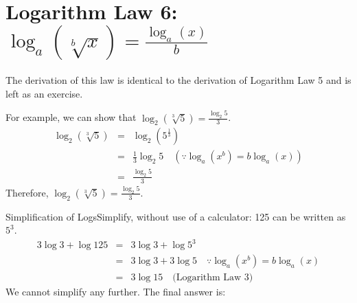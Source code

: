 \section{Logarithm Law 6: $\log_{a}\left(\sqrt[b]{x}\right) = \frac{\log_{a}(x)}{b}$}

The derivation of this law is identical to the derivation of Logarithm Law 5 and is left as an exercise.

For example, we can show that $\log_{2}(\sqrt[3]{5}) = \frac{\log_{2}5}{3} $.
\begin{eqnarray*}
\log_{2}(\sqrt[3]{5}) &=& \log_2 (5^{\frac{1}{3}})\\
&=& \frac{1}{3} \log_2 5 \quad (\because \log_{a}(x^b) = b \log_{a}(x))\\
&=&\frac{\log_{2}5}{3}
\end{eqnarray*}
Therefore, $\log_{2}(\sqrt[3]{5}) = \frac{\log_{2}5}{3}$.



\begin{wex}{Simplification of Logs}{Simplify, without use of a calculator:
}
{
125 can be written as $5^3$.
\begin{eqnarray*}
3\log 3 + \log 125 &=&3\log 3 + \log 5^3\\
&=&3\log 3 + 3\log 5 \quad \because \log_{a}(x^b) = b \log_{a}(x)\\
&=&3\log 15 \quad \mbox{(Logarithm Law 3)}
\end{eqnarray*}
We cannot simplify any further. The final answer is:
}\end{wex}

